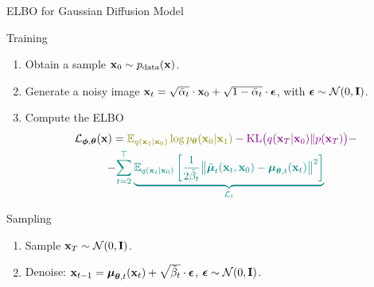 \documentclass{beamer}
\renewcommand{\eqpause}{}
\begin{document}
\begin{frame}{ELBO for Gaussian Diffusion Model}
    \begin{block}{Training}
        \begin{enumerate}
            \item Obtain a sample $\mathbf{x}_0 \sim p_{\text{data}}(\mathbf{x})$.
            \item Generate a noisy image $\mathbf{x}_t = \sqrt{\bar{\alpha}_t} \cdot \mathbf{x}_0 + \sqrt{1 - \bar{\alpha}_t} \cdot \boldsymbol{\epsilon}$, with $\boldsymbol{\epsilon} \sim \mathcal{N}(0, \mathbf{I})$.
            \item Compute the ELBO
            \vspace{-0.3cm}
            \begin{multline*}
                \cL_{\bphi, \btheta}(\bx) =  {\color{olive}\bbE_{q(\bx_1 | \bx_0)} \log \pt(\bx_0 | \bx_1)} - {\color{violet}\KL\bigl(q(\bx_T | \bx_0) \| p(\bx_T)\bigr)} - \\
                - {\color{teal}\sum_{t=2}^\top \underbrace{ \bbE_{q(\bx_t | \bx_0)} \left[\frac{1}{2\tilde{\beta}_t} \bigl\| \tilde{\bmu}_t(\bx_t, \bx_0) - \bmu_{\btheta, t}(\bx_t) \bigr\|^2  \right]}_{\cL_t}}
            \end{multline*}
            \vspace{-0.7cm}
        \end{enumerate}
    \end{block}
    \eqpause
    \begin{block}{Sampling}
        \begin{enumerate}
            \item Sample $\mathbf{x}_T \sim \mathcal{N}(0, \mathbf{I})$.
            \item Denoise: $\mathbf{x}_{t - 1} = \boldsymbol{\mu}_{\boldsymbol{\theta}, t}(\mathbf{x}_t) +  \sqrt{\tilde{\beta}_t} \cdot \boldsymbol{\epsilon}$, $\boldsymbol{\epsilon} \sim \mathcal{N}(0, \mathbf{I})$.
        \end{enumerate}
    \end{block}
\end{frame}
\end{document}
